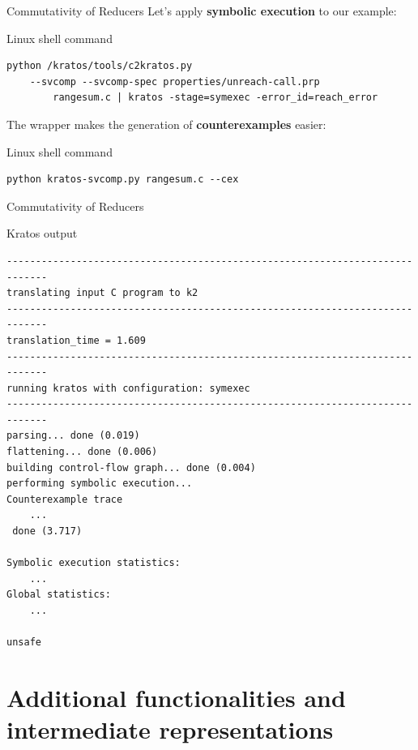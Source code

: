 \documentclass[aspectratio=1610,10.5pt]{beamer} %
\begin{document}
\begin{frame}[fragile]{Commutativity of Reducers}
    Let's apply \textbf{symbolic execution} to our example:

    \begin{block}{Linux shell command}
            \begin{verbatim}
python /kratos/tools/c2kratos.py
    --svcomp --svcomp-spec properties/unreach-call.prp
        rangesum.c | kratos -stage=symexec -error_id=reach_error
            \end{verbatim}
    \end{block}

    \bigskip

    \pause

    The wrapper makes the generation of \textbf{counterexamples} easier:

    \begin{block}{Linux shell command}
            \begin{verbatim}
python kratos-svcomp.py rangesum.c --cex
            \end{verbatim}
    \end{block}
\end{frame}

\begin{frame}[fragile]{Commutativity of Reducers}
    \begin{block}{Kratos output}
            \begin{verbatim}
-----------------------------------------------------------------------------
translating input C program to k2
-----------------------------------------------------------------------------
translation_time = 1.609
-----------------------------------------------------------------------------
running kratos with configuration: symexec
-----------------------------------------------------------------------------
parsing... done (0.019)
flattening... done (0.006)
building control-flow graph... done (0.004)
performing symbolic execution...
Counterexample trace
    ...
 done (3.717)

Symbolic execution statistics:
    ...
Global statistics:
    ...

unsafe
            \end{verbatim}
    \end{block}
\end{frame}

\section{Additional functionalities and intermediate representations}
\end{document}
